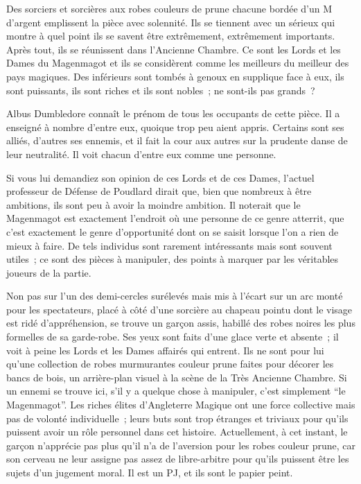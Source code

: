 Des sorciers et sorcières aux robes couleurs de prune chacune bordée d'un M d'argent emplissent la pièce avec solennité. Ils se tiennent avec un sérieux qui montre à quel point ils se savent être extrêmement, extrêmement importants. Après tout, ils se réunissent dans l'Ancienne Chambre. Ce sont les Lords et les Dames du Magenmagot et ils se considèrent comme les meilleurs du meilleur des pays magiques. Des inférieurs sont tombés à genoux en supplique face à eux, ils sont puissants, ils sont riches et ils sont nobles~; ne sont-ils pas grands~?

Albus Dumbledore connaît le prénom de tous les occupants de cette pièce. Il a enseigné à nombre d'entre eux, quoique trop peu aient appris. Certains sont ses alliés, d'autres ses ennemis, et il fait la cour aux autres sur la prudente danse de leur neutralité. Il voit chacun d'entre eux comme une personne.

Si vous lui demandiez son opinion de ces Lords et de ces Dames, l'actuel professeur de Défense de Poudlard dirait que, bien que nombreux à être ambitions, ils sont peu à avoir la moindre ambition. Il noterait que le Magenmagot est exactement l'endroit où une personne de ce genre atterrit, que c'est exactement le genre d'opportunité dont on se saisit lorsque l'on a rien de mieux à faire. De tels individus sont rarement intéressants mais sont souvent utiles~; ce sont des pièces à manipuler, des points à marquer par les véritables joueurs de la partie.

Non pas sur l'un des demi-cercles surélevés mais mis à l'écart sur un arc monté pour les spectateurs, placé à côté d'une sorcière au chapeau pointu dont le visage est ridé d'appréhension, se trouve un garçon assis, habillé des robes noires les plus formelles de sa garde-robe. Ses yeux sont faits d'une glace verte et absente~; il voit à peine les Lords et les Dames affairés qui entrent. Ils ne sont pour lui qu'une collection de robes murmurantes couleur prune faites pour décorer les bancs de bois, un arrière-plan visuel à la scène de la Très Ancienne Chambre. Si un ennemi se trouve ici, s'il y a quelque chose à manipuler, c'est simplement “le Magenmagot”. Les riches élites d'Angleterre Magique ont une force collective mais pas de volonté individuelle~; leurs buts sont trop étranges et triviaux pour qu'ils puissent avoir un rôle personnel dans cet histoire. Actuellement, à cet instant, le garçon n'apprécie pas plus qu'il n'a de l'aversion pour les robes couleur prune, car son cerveau ne leur assigne pas assez de libre-arbitre pour qu'ils puissent être les sujets d'un jugement moral. Il est un PJ\footnotemark{}, et ils sont le papier peint.

